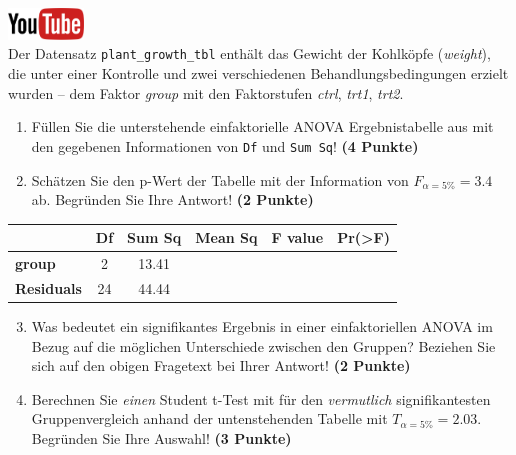 \documentclass[a4paper, 10pt]{scrartcl}\usepackage[]{graphicx}\usepackage[]{xcolor}
\begin{document}
\hfill\href{https://youtu.be/49hvImMwVyE}{\includegraphics[width =
  2cm]{img/youtube}}\\[1Ex]


Der Datensatz \texttt{plant\_growth\_tbl} enth{\"a}lt das Gewicht der Kohlk{\"o}pfe
(\textit{weight}), die unter einer Kontrolle und zwei verschiedenen
Behandlungsbedingungen erzielt wurden -- dem Faktor \textit{group} mit den
Faktorstufen \textit{ctrl}, \textit{trt1}, \textit{trt2}.



\begin{enumerate}
\item F{\"u}llen Sie die unterstehende einfaktorielle ANOVA Ergebnistabelle aus
  mit den gegebenen Informationen von \texttt{Df} und \texttt{Sum Sq}!
  \textbf{(4 Punkte)}
\item Sch{\"a}tzen Sie den p-Wert der Tabelle mit der Information von
  $F_{\alpha = 5\%} = 3.4$ ab. Begr{\"u}nden Sie Ihre
  Antwort! \textbf{(2 Punkte)}
\end{enumerate}

\vspace{1Ex}

\begin{center}
  \Large
  \begin{tabular}{l|c|c|c|c|c}
     & \textbf{Df} & \textbf{Sum Sq} & \textbf{Mean Sq} & \textbf{F value} & \textbf{Pr(>F)} \strut\\
    \hline
   \textbf{group}  & 2 & 13.41 &  &  &  \strut\\
    \hline
   \textbf{Residuals}  & 24 & 44.44 &  &  &  \strut\\
  \end{tabular}
\end{center}

\vspace{1Ex}

\begin{enumerate}
  \setcounter{enumi}{2}
\item Was bedeutet ein signifikantes Ergebnis in einer einfaktoriellen
  ANOVA im Bezug auf die m{\"o}glichen Unterschiede zwischen den Gruppen? Beziehen Sie sich auf den obigen Fragetext bei Ihrer Antwort!
  \textbf{(2 Punkte)}
\item Berechnen Sie \textit{einen} Student t-Test mit f{\"u}r den \textit{vermutlich}
  signifikantesten Gruppenvergleich anhand der untenstehenden Tabelle mit
  $T_{\alpha = 5\%} = 2.03$. Begr{\"u}nden Sie Ihre Auswahl! \textbf{(3 Punkte)}
\end{enumerate}
\end{document}
